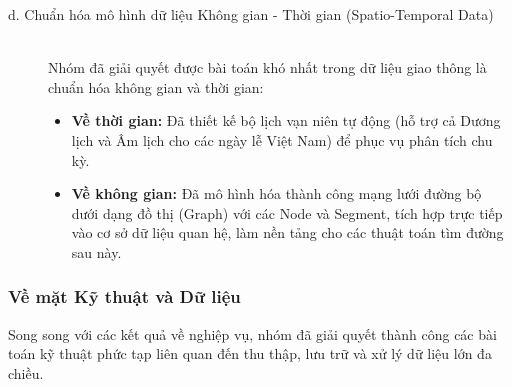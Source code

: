 \begin{description}
    \item[d. Chuẩn hóa mô hình dữ liệu Không gian - Thời gian (Spatio-Temporal Data)] \hfill \\
    Nhóm đã giải quyết được bài toán khó nhất trong dữ liệu giao thông là chuẩn hóa không gian và thời gian:
    \begin{itemize}
        \item \textbf{Về thời gian:} Đã thiết kế bộ lịch vạn niên tự động (hỗ trợ cả Dương lịch và Âm lịch cho các ngày lễ Việt Nam) để phục vụ phân tích chu kỳ.
        \item \textbf{Về không gian:} Đã mô hình hóa thành công mạng lưới đường bộ dưới dạng đồ thị (Graph) với các Node và Segment, tích hợp trực tiếp vào cơ sở dữ liệu quan hệ, làm nền tảng cho các thuật toán tìm đường sau này.
    \end{itemize}
\end{description}

\subsubsection{Về mặt Kỹ thuật và Dữ liệu}
Song song với các kết quả về nghiệp vụ, nhóm đã giải quyết thành công các bài toán kỹ thuật phức tạp liên quan đến thu thập, lưu trữ và xử lý dữ liệu lớn đa chiều.

